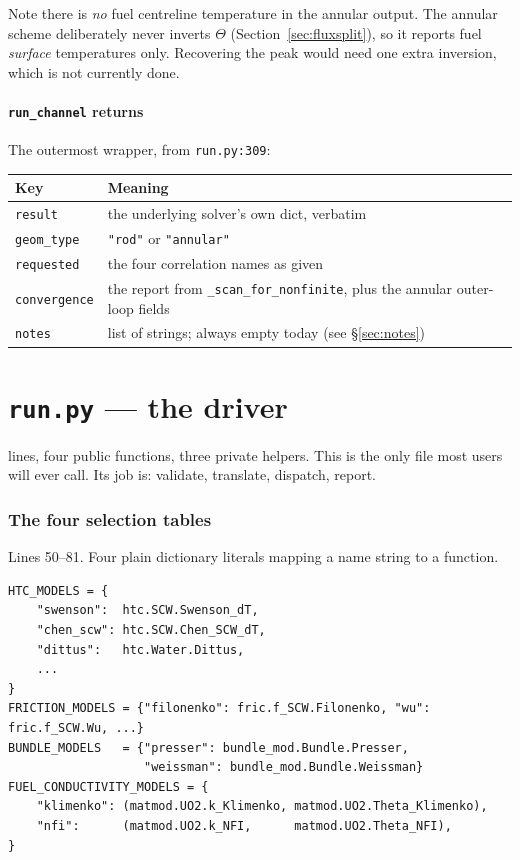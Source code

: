 \documentclass[11pt]{article}
\newcommand{\code}[1]{\texttt{#1}}
\begin{document}
Note there is \emph{no} fuel centreline temperature in the annular output. The annular
scheme deliberately never inverts $\Theta$ (Section~\ref{sec:fluxsplit}), so it reports
fuel \emph{surface} temperatures only. Recovering the peak would need one extra
inversion, which is not currently done.

\subsection{\code{run\_channel} returns}
The outermost wrapper, from \code{run.py:309}:
\begin{center}
\begin{tabular}{lp{9.0cm}}
\toprule
Key & Meaning \\
\midrule
\code{result} & the underlying solver's own dict, verbatim \\
\code{geom\_type} & \code{"rod"} or \code{"annular"} \\
\code{requested} & the four correlation names as given \\
\code{convergence} & the report from \code{\_scan\_for\_nonfinite}, plus the annular
outer-loop fields \\
\code{notes} & list of strings; always empty today (see \S\ref{sec:notes}) \\
\bottomrule
\end{tabular}
\end{center}

\newpage
\part{\code{run.py} --- the driver}

 lines, four public functions, three private helpers. This is the only file most
users will ever call. Its job is: validate, translate, dispatch, report.

\section{The four selection tables}

Lines 50--81. Four plain dictionary literals mapping a name string to a function.

\begin{lstlisting}
HTC_MODELS = {
    "swenson":  htc.SCW.Swenson_dT,
    "chen_scw": htc.SCW.Chen_SCW_dT,
    "dittus":   htc.Water.Dittus,
    ...
}
FRICTION_MODELS = {"filonenko": fric.f_SCW.Filonenko, "wu": fric.f_SCW.Wu, ...}
BUNDLE_MODELS   = {"presser": bundle_mod.Bundle.Presser,
                   "weissman": bundle_mod.Bundle.Weissman}
FUEL_CONDUCTIVITY_MODELS = {
    "klimenko": (matmod.UO2.k_Klimenko, matmod.UO2.Theta_Klimenko),
    "nfi":      (matmod.UO2.k_NFI,      matmod.UO2.Theta_NFI),
}
\end{lstlisting}
\end{document}
